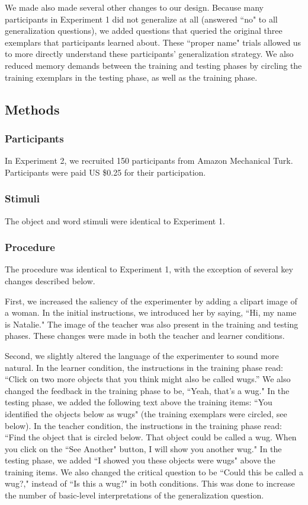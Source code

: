 \documentclass[man]{apa2}
\begin{document}
We made also made several other changes to our design. Because many participants in Experiment 1 did not generalize at all (answered ``no" to all generalization questions), we added questions that queried the original three exemplars that participants  learned about. These ``proper name" trials allowed us to more directly understand these participants' generalization strategy. We also reduced memory demands between the training and testing phases by circling the training exemplars in the testing phase, as well as the training phase.

\subsection{Methods}

\subsubsection{Participants} In Experiment 2, we recruited 150 participants from Amazon Mechanical Turk. Participants were paid US \$0.25 for their participation.

\subsubsection{Stimuli}
The object and word stimuli were identical to Experiment 1.

\subsubsection{Procedure}
The procedure was identical to Experiment 1, with the exception of several key changes described below.

First, we increased the saliency of the experimenter by adding a clipart image of a woman. In the initial instructions, we introduced her by saying, ``Hi, my name is Natalie." The image of the teacher was also present in the training and testing phases. These changes were made in both the teacher and learner conditions.

Second, we slightly altered the language of the experimenter to sound more natural. In the learner condition, the instructions in the training phase read: ``Click on two more objects that you think might also be called wugs.'' We also changed the feedback in the training phase to be, ``Yeah, that's a wug." In the testing phase, we added the following text above the training items: ``You identified the objects below as wugs" (the training exemplars were circled, see below). In the teacher condition, the instructions in the training phase read: ``Find the object that is circled below. That object could be called a wug. When you click on the ``See Another" button, I will show you another wug." In the testing phase, we added ``I showed you these objects were wugs" above the training items.  We also changed the critical question to be ``Could this be called a wug?," instead of ``Is this a wug?" in both conditions. This was done to increase the number of basic-level interpretations of the generalization question. 
\end{document}

